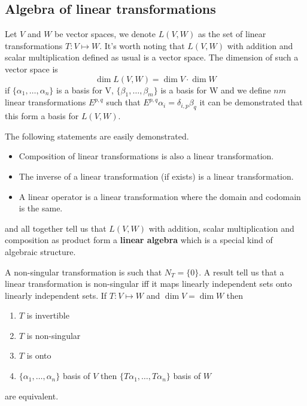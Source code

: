 \documentclass[../main.tex]{subfiles}
\begin{document}
\subsection{Algebra of linear transformations}
Let $V$ and $W$ be vector spaces, we denote $L(V,W)$ as the set of linear transformations $T:V\mapsto W$. It's worth noting that $L(V,W)$ with addition and scalar multiplication defined as usual is a vector space. The dimension of such a vector space is
\begin{equation*}
    \dim L(V,W) = \dim V \cdot \dim W
\end{equation*}
if $\{\alpha_1,\dots,\alpha_n\}$ is a basis for V, $\{\beta_1,\dots,\beta_m\}$ is a basis for W and we define $nm$ linear transformations $E^{p,q}$ such that $E^{p,q}\alpha_i = \delta_{i,p}\beta_q$ it can be demonstrated that this form a basis for $L(V,W)$.

The following statements are easily demonstrated.
\begin{itemize}
    \item Composition of linear transformations is also a linear transformation.
    \item The inverse of a linear transformation (if exists) is a linear transformation.
    \item A linear operator is a linear transformation where the domain and codomain is the same. 
\end{itemize}
and all together tell us that $L(V,W)$ with addition, scalar multiplication and composition as product form a \textbf{linear algebra} which is a special kind of algebraic structure.

A non-singular transformation is such that $N_T=\{0\}$. A result tell us that a linear transformation is non-singular iff it maps linearly independent sets onto linearly independent sets. If $T:V\mapsto W$ and $\dim V = \dim W$ then
\begin{enumerate}
    \item $T$ is invertible
    \item $T$ is non-singular
    \item $T$ is onto 
    \item $\{\alpha_1,\dots,\alpha_n\}$ basis of $V$ then $\{T\alpha_1,\dots,T\alpha_n\}$ basis of $W$
\end{enumerate}
are equivalent.
\end{document}
